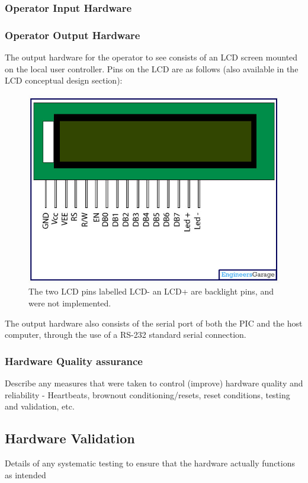 \documentclass[]{report}
\begin{document}
\subsubsection{Operator Input Hardware}

\subsubsection{Operator Output Hardware}
The output hardware for the operator to see consists of an LCD screen mounted on the local user controller. Pins on the LCD are as follows (also available in the LCD conceptual design section):

\begin{figure}
\centering
\includegraphics[width=0.7\linewidth]{"../Diagrams/LcdPins"}
\caption[LCDPinDiagram]{The two LCD pins labelled LCD- an LCD+ are backlight pins, and were not implemented.}
\label{fig:LCDPinDiagram}
\end{figure}

The output hardware also consists of the serial port of both the PIC and the host computer, through the use of a RS-232 standard serial connection.


\subsubsection{Hardware Quality assurance}
Describe any measures that were taken to control (improve) hardware quality and reliability - Heartbeats, brownout conditioning/resets, reset conditions, testing and validation, etc.

\subsection{Hardware Validation}
Details of any systematic testing to ensure that the hardware actually functions as intended
\end{document}
